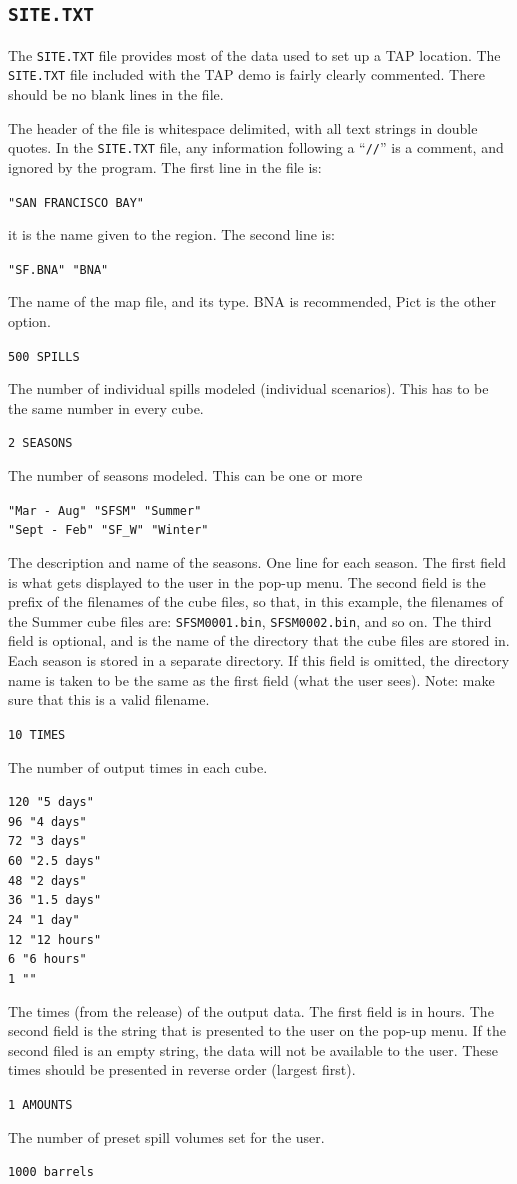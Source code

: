 \documentclass[12pt]{article}      %
\newcommand{\tap}{\textsf{TAP}\xspace}
\newcommand{\filename}[1]{\texttt{#1}}
\newcommand{\fileline}[1]{\begin{flushleft}\texttt{#1}\end{flushleft}}
\begin{document}
\subsection{\filename{SITE.TXT}}\label{sec:site.txt}
The \filename{SITE.TXT} file provides most of the data used to set up 
a \tap location. The 
\filename{SITE.TXT} file included with the \tap demo is fairly 
clearly commented. There should be no blank lines in the file.

The header of the file is whitespace delimited, with all text strings in
double quotes. In the \filename{SITE.TXT} file, any information
following a ``\texttt{//}'' is a comment, and ignored by the
program. The first line in the file is:
\fileline{"SAN FRANCISCO BAY"}
it is the name given to the region. The second line is:
\fileline{"SF.BNA" "BNA"}
The name of the map file, and its type. BNA is recommended, Pict is the 
other option.
\fileline{500 SPILLS }
The number of individual spills modeled (individual scenarios). This 
has to be the same number in every cube.
\fileline{2 SEASONS }
The number of seasons modeled. This can be one or more 
\fileline{"Mar - Aug"  "SFSM" "Summer" \\
          "Sept - Feb"  "SF\_W" "Winter"}
The description and name of the seasons. One line for each season.  The
first field is what gets displayed to the user in the pop-up menu.  The
second field is the prefix of the filenames of the cube files, so that,
in this example, the filenames of the Summer cube files are:
\filename{SFSM0001.bin}, \filename{SFSM0002.bin}, and so on.  The third
field is optional, and is the name of the directory that the cube files
are stored in.  Each season is stored in a separate directory.  If this
field is omitted, the directory name is taken to be the same as the
first field (what the user sees).  Note: make sure that this is a valid
filename.
\fileline{10 TIMES}
The number of output times in each cube.
\fileline{120 "5 days" \\
  96 "4 days" \\
  72 "3 days" \\
  60 "2.5 days" \\
  48 "2 days" \\
  36 "1.5 days"\\ 
  24 "1 day" \\
  12 "12 hours" \\
  6 "6 hours" \\
  1 ""}
The times (from the release) of the output data. The first field is 
in hours. The second field is the string that is presented to the user 
on the pop-up menu. If the second filed is an empty string, the data 
will not be available to the user. These times should be presented in
reverse order (largest first).
\fileline{1 AMOUNTS}
The number of preset spill volumes set for the user.
\fileline{1000 barrels }
\end{document}
